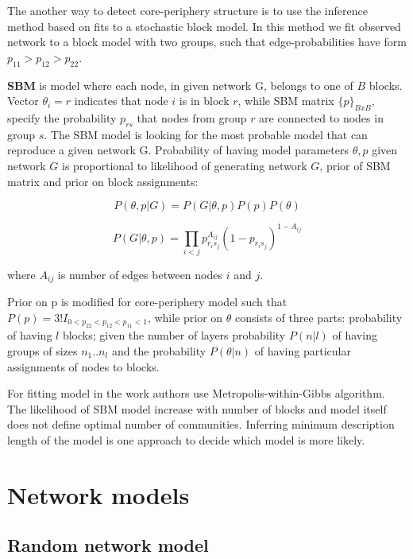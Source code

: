 The another way to detect core-periphery structure is to use the inference method based on fits to a stochastic block model. In this method we fit observed network to a block model with two groups, such that edge-probabilities have form $p_{11}> p_{12} > p_{22}$.

\textbf{SBM} is model where each node, in given network G,  belongs to one of $B$ blocks. Vector $\theta_i = r$ indicates that node $i$ is in block $r$, while SBM matrix $\{p\}_{BxB}$, specify the probability $p_{rs}$ that nodes from group $r$ are connected to nodes in group $s$. The SBM model is looking for the most probable model that can reproduce a given network G. Probability of having model parameters $\theta, p$ given network $G$ is proportional to likelihood of generating network $G$, prior of SBM matrix and prior on block assignments:

\begin{equation}
P(\theta, p| G) = P(G | \theta , p) P(p) P(\theta) 
\end{equation}

\begin{equation}
P(G | \theta , p) = \prod_{i<j} p_{r_is_j}^{A_{ij}}(1-p_{r_is_j})^{1-A_{ij}}  
\end{equation}

where $A_{ij}$ is number of edges between nodes $i$ and $j$. 

Prior on p is modified for core-periphery model such that $P(p) = 3!I_{0<p_{22}<p_{12}<p_{11}<1}$, while prior on $\theta $ consists of three parts: probability of having $l$ blocks; given the number of layers probability $P(n|l)$ of having groups of sizes ${n_1..n_l}$ and the probability $P(\theta|n)$ of having particular assignments of nodes to blocks. 

For fitting model in the work \cite{gallagher2020clarified} authors use Metropolis-within-Gibbs algorithm.
The likelihood of SBM model increase with number of blocks and model itself does not define optimal number of communities. Inferring minimum description length
of the model is one approach to decide which model is more likely.   


\section{Network models}

\subsection{Random network model}

